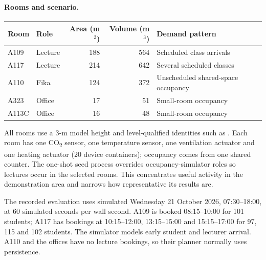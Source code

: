 \documentclass[11pt,a4paper]{article}
\begin{document}
\paragraph{Rooms and scenario.}\mbox{}\par
\noindent\begin{tabularx}{\linewidth}{llrrX}\toprule Room & Role & Area (m$^2$) & Volume (m$^3$) & Demand pattern\\\midrule
A109 & Lecture & 188 & 564 & Scheduled class arrivals\\
A117 & Lecture & 214 & 642 & Several scheduled classes\\
A110 & Fika & 124 & 372 & Unscheduled shared-space occupancy\\
A323 & Office & 17 & 51 & Small-room occupancy\\
A113C & Office & 16 & 48 & Small-room occupancy\\\bottomrule\end{tabularx}
All rooms use a 3-m model height and level-qualified identities such as \protect{}. Each room has one CO\textsubscript{2} sensor, one temperature sensor, one ventilation actuator and one heating actuator (20 device containers); occupancy comes from one shared counter. The one-shot seed process overrides occupancy-simulator roles so lectures occur in the selected rooms. This concentrates useful activity in the demonstration area and narrows how representative its results are.

The recorded evaluation uses simulated Wednesday 21 October 2026, 07:30--18:00, at 60 simulated seconds per wall second. A109 is booked 08:15--10:00 for 101 students; A117 has bookings at 10:15--12:00, 13:15--15:00 and 15:15--17:00 for 97, 115 and 102 students. The simulator models early student and lecturer arrival. A110 and the offices have no lecture bookings, so their planner normally uses persistence.
\end{document}
